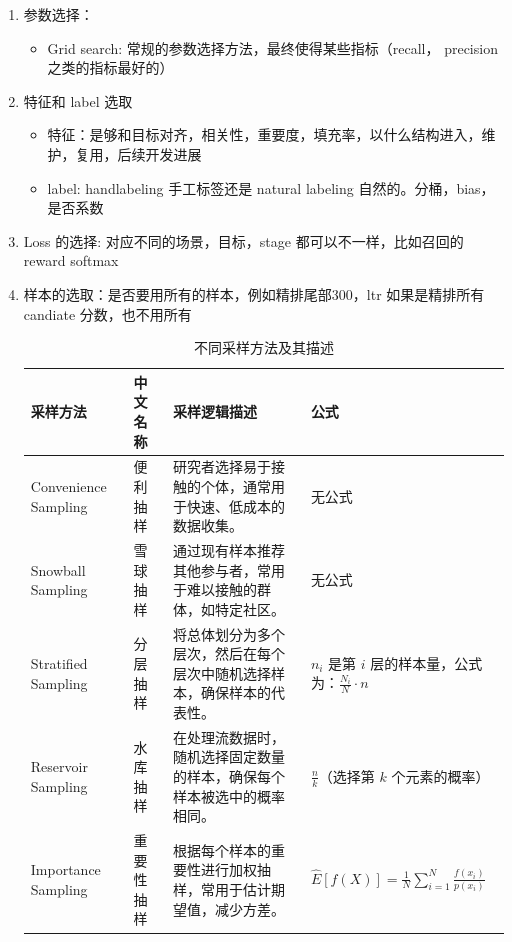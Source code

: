 \documentclass[12pt]{article}
\numberwithin{theorem}{section} %
\numberwithin{definition}{section} %
\numberwithin{assumption}{section} %
\numberwithin{lemma}{section} %
\numberwithin{remark}{section} %
\numberwithin{prop}{section} %
\numberwithin{corollary}{section} %
\numberwithin{example}{section} %
\numberwithin{question}{section} %
\numberwithin{problem}{section} %
\numberwithin{conjecture}{section} %
\numberwithin{append}{section} %
\numberwithin{property}{section} %
\begin{document}
\begin{CJK}{UTF8}{gbsn}
		\normalsize
		\begin{enumerate}
			\item 参数选择： 
			\begin{itemize}
				\item Grid search: 常规的参数选择方法，最终使得某些指标（recall， precision 之类的指标最好的）
			\end{itemize}
			\item 特征和 label 选取
			\begin{itemize}
				\item 特征：是够和目标对齐，相关性，重要度，填充率，以什么结构进入，维护，复用，后续开发进展
				\item label: handlabeling 手工标签还是 natural labeling 自然的。分桶，bias，是否系数
			\end{itemize}
			\item Loss 的选择: 对应不同的场景，目标，stage 都可以不一样，比如召回的 reward softmax
			\item 样本的选取：是否要用所有的样本，例如精排尾部300，ltr 如果是精排所有 candiate 分数，也不用所有
			\begin{table}[h]
				\centering
				\begin{tabular}{|p{3cm}|p{3cm}|p{4cm}|p{5cm}|}
					\toprule
					\textbf{采样方法} & \textbf{中文名称} & \textbf{采样逻辑描述} & \textbf{公式} \\ 
					\midrule
					Convenience Sampling & 便利抽样 & 研究者选择易于接触的个体，通常用于快速、低成本的数据收集。 & 无公式 \\ 
					\midrule
					Snowball Sampling & 雪球抽样 & 通过现有样本推荐其他参与者，常用于难以接触的群体，如特定社区。 & 无公式 \\ 
					\midrule
					Stratified Sampling & 分层抽样 & 将总体划分为多个层次，然后在每个层次中随机选择样本，确保样本的代表性。 & \( n_i \) 是第 \( i \) 层的样本量，公式为：\(\frac{N_i}{N} \cdot n\) \\ 
					\midrule
					Reservoir Sampling & 水库抽样 & 在处理流数据时，随机选择固定数量的样本，确保每个样本被选中的概率相同。 & \(\frac{n}{k}\)（选择第 \( k \) 个元素的概率） \\ 
					\midrule
					Importance Sampling & 重要性抽样 & 根据每个样本的重要性进行加权抽样，常用于估计期望值，减少方差。 & \(\hat{E}[f(X)] = \frac{1}{N} \sum_{i=1}^{N} \frac{f(x_i)}{p(x_i)}\) \\ 
					\bottomrule
				\end{tabular}
				\caption{不同采样方法及其描述}
			\end{table}

\end{enumerate}
\end{CJK}
\end{document}
